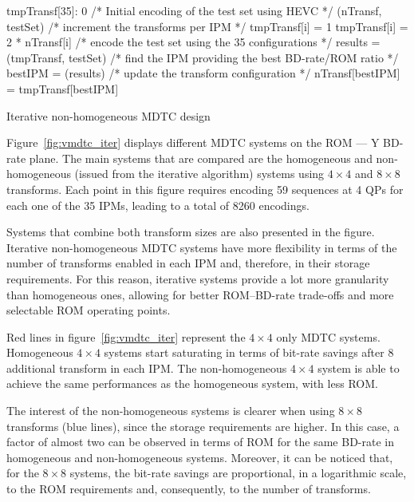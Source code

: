 \documentclass[11pt,a4paper,openright,twoside]{book}
\numberwithin{equation}{section} %
\numberwithin{figure}{section} %
\numberwithin{table}{section} %
\begin{document}
\begin{algorithm}
	\small
	\BlankLine%
	\BlankLine%
	tmpTransf[35]: 0
	\BlankLine%
	/* Initial encoding of the test set using HEVC */
	\BlankLine%
	\encode(nTransf, testSet)
	\BlankLine%
	{
		/* increment the transforms per IPM */
		\BlankLine%
		{
			{
				tmpTransf[i] = 1
			}
			{
				tmpTransf[i] = 2 * nTransf[i]
			}
		}
		\BlankLine%
		/* encode the test set using the 35 configurations */
		\BlankLine%
		results = \encode(tmpTransf, testSet)
		\BlankLine%
		/* find the IPM providing the best BD-rate/ROM ratio */
		\BlankLine%
		bestIPM = \computeBestRatio(results)
		\BlankLine%
		/* update the transform configuration */
		\BlankLine%
		nTransf[bestIPM] = tmpTransf[bestIPM]
	}
	\caption{Iterative non-homogeneous \acs{MDTC} design}
	\label{alg:vmdtc_iter}
\end{algorithm}

Figure~\ref{fig:vmdtc_iter} displays different \ac{MDTC} systems on the
\acs{ROM} --- Y \ac{BD}-rate plane.
The main systems that are compared are the homogeneous and non-homogeneous
(issued from the iterative algorithm) systems using $4\times4$ and $8\times8$
transforms.
Each point in this figure requires encoding 59 sequences at 4 \acp{QP} for
each one of the 35 \acp{IPM}, leading to a total of \num{8260} encodings.

Systems that combine both transform sizes are also presented in the figure.
Iterative non-homogeneous \ac{MDTC} systems have more flexibility in terms of
the number of transforms enabled in each \ac{IPM} and, therefore, in their
storage requirements.
For this reason, iterative systems provide a lot more granularity than
homogeneous ones, allowing for better \acs{ROM}--\ac{BD}-rate trade-offs
and more selectable \acs{ROM} operating points.

Red lines in figure~\ref{fig:vmdtc_iter} represent the $4\times4$ only
\ac{MDTC} systems.
Homogeneous $4\times4$ systems start saturating in terms of bit-rate savings
after 8 additional transform in each \ac{IPM}.
The non-homogeneous $4\times4$ system is able to achieve the same performances
as the homogeneous system, with less \acs{ROM}.

The interest of the non-homogeneous systems is clearer when using $8\times8$
transforms (blue lines), since the storage requirements are higher.
In this case, a factor of almost two can be observed in terms of \acs{ROM} for
the same \ac{BD}-rate in homogeneous and non-homogeneous systems.
Moreover, it can be noticed that, for the $8\times8$ systems, the bit-rate
savings are proportional, in a logarithmic scale, to the \acs{ROM}
requirements and, consequently, to the number of transforms.
\end{document}
